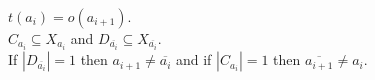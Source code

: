 \documentclass[preview]{standalone}
\begin{document}
$t(a_i) = o(a_{i+1})$.\\$C_{a_i} \subseteq X_{a_i}$ and $D_{\overline{a_i}} \subseteq X_{\overline{a_i}}$.\\If $\left|D_{\overline{a_i}}\right| = 1$ then $a_{i+1} \not= \overline{a_i}$ and if $\left|C_{a_i}\right| = 1$ then $\overline{a_{i+1}} \not= a_i$.\\
\end{document}
